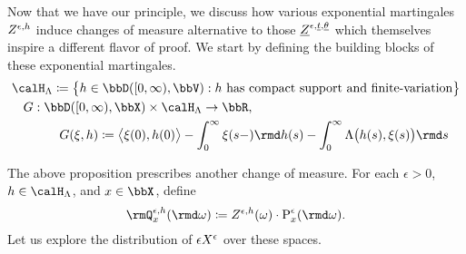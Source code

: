 Now that we have our principle, we discuss how various exponential martingales $Z^{\epsilon,h}$ induce changes of measure alternative to those $\underline{Z}^{\epsilon,\underline t,\underline{\theta}}$ which themselves inspire a different flavor of proof.
We start by defining the building blocks of these exponential martingales.
\begin{gather*}
  \twistSpace \defeq \big\{ \twistFunc \in \pathSpace{[0,\infty)}{\vecSpace} : \twistFunc \text{ has compact support and finite-variation} \big\} \\
  \begin{aligned}[t]
    &\mgRf: \pathSpace{[0,\infty)}{\stateSpace} \times \twistSpace \rightarrow \bbR,  \\
    &\hspace{1cm} \mgRf(\pathVar, \twistFunc) \defeq \bprj{\pathVar(0)}{\twistFunc(0)} -\int_0^\infty \pathVar(s-) \rmd\twistFunc(s) - \int_0^\infty \ode\big(\twistFunc(s), \pathVar(s)\big) \rmd s
  \end{aligned}
\end{gather*}



The above proposition prescribes another change of measure.
For each $\epsilon > 0$, $\twistFunc \in \twistSpace$, and $\stateVar \in \stateSpace$, define
\begin{equation*}
  \mgPrb^{\epsilon,\twistFunc}_\stateVar(\rmd\omega) \defeq \mgDensity^{\epsilon,\twistFunc}(\omega) \cdot \Prb^\epsilon_\stateVar(\rmd\omega).
\end{equation*}
Let us explore the distribution of $\epsilon X^\epsilon$ over these spaces.



